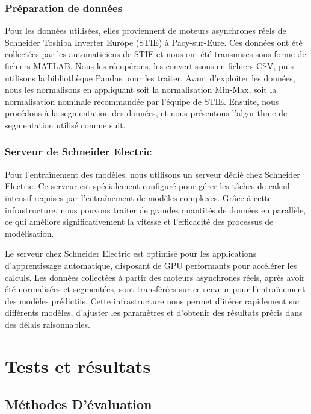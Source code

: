 \subsubsection{Préparation de données}

Pour les données utilisées, elles proviennent de moteurs asynchrones réels de
Schneider Toshiba Inverter Europe (STIE) à Pacy-sur-Eure. Ces données ont été
collectées par les automaticiens de STIE et nous ont été transmises sous forme
de fichiers MATLAB. Nous les récupérons, les convertissons en fichiers CSV,
puis utilisons la bibliothèque Pandas pour les traiter. Avant d'exploiter les
données, nous les normalisons en appliquant soit la normalisation Min-Max, soit
la normalisation nominale recommandée par l'équipe de STIE. Ensuite, nous
procédons à la segmentation des données, et nous présentons l'algorithme de
segmentation utilisé comme suit.

\subsubsection{Serveur de Schneider Electric}

Pour l'entraînement des modèles, nous utilisons un serveur dédié chez Schneider
Electric. Ce serveur est spécialement configuré pour gérer les tâches de calcul
intensif requises par l'entraînement de modèles complexes. Grâce à cette
infrastructure, nous pouvons traiter de grandes quantités de données en
parallèle, ce qui améliore significativement la vitesse et l'efficacité des
processus de modélisation.

Le serveur chez Schneider Electric est optimisé pour les applications
d'apprentissage automatique, disposant de GPU performants pour accélérer les
calculs. Les données collectées à partir des moteurs asynchrones réels, après
avoir été normalisées et segmentées, sont transférées sur ce serveur pour
l'entraînement des modèles prédictifs. Cette infrastructure nous permet
d'itérer rapidement sur différents modèles, d'ajuster les paramètres et
d'obtenir des résultats précis dans des délais raisonnables.

\section{Tests et résultats}

\subsection{Méthodes D'évaluation}

